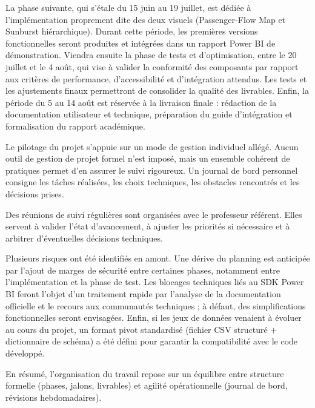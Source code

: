 La phase suivante, qui s’étale du 15 juin au 19 juillet, est dédiée à l’implémentation proprement dite des deux visuels (Passenger-Flow Map et Sunburst hiérarchique). Durant cette période, les premières versions fonctionnelles seront produites et intégrées dans un rapport Power BI de démonstration. Viendra ensuite la phase de tests et d’optimisation, entre le 20 juillet et le 4 août, qui vise à valider la conformité des composants par rapport aux critères de performance, d’accessibilité et d’intégration attendus. Les tests et les ajustements finaux permettront de consolider la qualité des livrables. Enfin, la période du 5 au 14 août est réservée à la livraison finale : rédaction de la documentation utilisateur et technique, préparation du guide d’intégration et formalisation du rapport académique.

Le pilotage du projet s’appuie sur un mode de gestion individuel allégé. Aucun outil de gestion de projet formel n’est imposé, mais un ensemble cohérent de pratiques permet d’en assurer le suivi rigoureux. Un journal de bord personnel consigne les tâches réalisées, les choix techniques, les obstacles rencontrés et les décisions prises.

Des réunions de suivi régulières sont organisées avec le professeur référent. Elles servent à valider l’état d’avancement, à ajuster les priorités si nécessaire et à arbitrer d’éventuelles décisions techniques.

Plusieurs risques ont été identifiés en amont. Une dérive du planning est anticipée par l’ajout de marges de sécurité entre certaines phases, notamment entre l’implémentation et la phase de test. Les blocages techniques liés au SDK Power BI feront l’objet d’un traitement rapide par l’analyse de la documentation officielle et le recours aux communautés techniques ; à défaut, des simplifications fonctionnelles seront envisagées. Enfin, si les jeux de données venaient à évoluer au cours du projet, un format pivot standardisé (fichier CSV structuré + dictionnaire de schéma) a été défini pour garantir la compatibilité avec le code développé.

En résumé, l’organisation du travail repose sur un équilibre entre structure formelle (phases, jalons, livrables) et agilité opérationnelle (journal de bord, révisions hebdomadaires).

